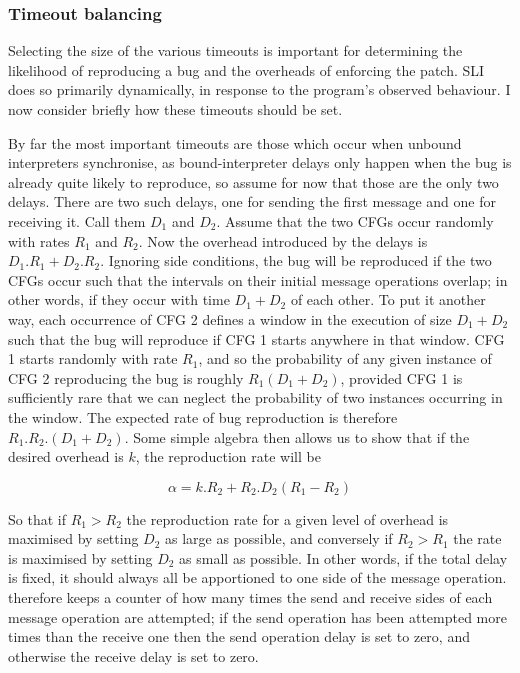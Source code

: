 \subsubsection{Timeout balancing}
\label{sect:using:timeout_balancing}

Selecting the size of the various timeouts is important for
determining the likelihood of reproducing a bug and the overheads of
enforcing the patch.  SLI does so primarily dynamically, in response
to the program's observed behaviour.  I now consider briefly how these
timeouts should be set.

By far the most important timeouts are those which occur when unbound
interpreters synchronise, as bound-interpreter delays only happen when
the bug is already quite likely to reproduce, so assume for now that
those are the only two delays.  There are two such delays, one for
sending the first message and one for receiving it.  Call them $D_1$
and $D_2$.  Assume that the two CFGs occur randomly with rates $R_1$
and $R_2$.  Now the overhead introduced by the delays is $D_1.R_1 +
D_2.R_2$.  Ignoring side conditions, the bug will be reproduced if the
two CFGs occur such that the intervals on their initial message
operations overlap; in other words, if they occur with time $D_1 +
D_2$ of each other.  To put it another way, each occurrence of CFG 2
defines a window in the execution of size $D_1 + D_2$ such that the
bug will reproduce if CFG 1 starts anywhere in that window.  CFG 1
starts randomly with rate $R_1$, and so the probability of any given
instance of CFG 2 reproducing the bug is roughly $R_1(D_1 + D_2)$,
provided CFG 1 is sufficiently rare that we can neglect the
probability of two instances occurring in the window.  The expected
rate of bug reproduction is therefore $R_1.R_2.(D_1+D_2)$.  Some
simple algebra then allows us to show that if the desired overhead is
$k$, the reproduction rate will be

\begin{displaymath}
\alpha = k.R_2 + R_2.D_2(R_1 - R_2)
\end{displaymath}

So that if $R_1 > R_2$ the reproduction rate for a given level of
overhead is maximised by setting $D_2$ as large as possible, and
conversely if $R_2 > R_1$ the rate is maximised by setting $D_2$ as
small as possible.  In other words, if the total delay is fixed, it
should always all be apportioned to one side of the message operation.
{\Implementation} therefore keeps a counter of how many times the send
and receive sides of each message operation are attempted; if the send
operation has been attempted more times than the receive one then the
send operation delay is set to zero, and otherwise the receive delay
is set to zero.

